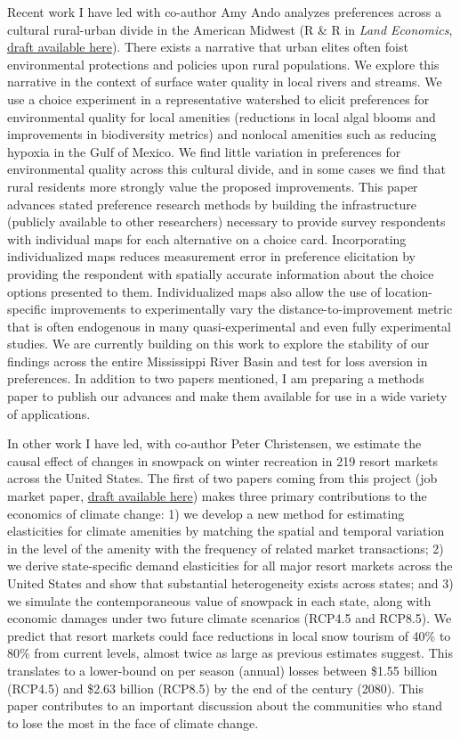\documentclass[12pt]{article}
\begin{document}
Recent work I have led with co-author Amy Ando analyzes preferences across a cultural rural-urban divide in the American Midwest (R \& R in \textit{Land Economics}, \href{https://bryanparthum.s3.us-east-2.amazonaws.com/Parthum_Ando_2019.pdf}{draft available here}). There exists a narrative that urban elites often foist environmental protections and policies upon rural populations. We explore this narrative in the context of surface water quality in local rivers and streams. We use a choice experiment in a representative watershed to elicit preferences for environmental quality for local amenities (reductions in local algal blooms and improvements in biodiversity metrics) and nonlocal amenities such as reducing hypoxia in the Gulf of Mexico. We find little variation in preferences for environmental quality across this cultural divide, and in some cases we find that rural residents more strongly value the proposed improvements. This paper advances stated preference research methods by building the infrastructure (publicly available to other researchers) necessary to provide survey respondents with individual maps for each alternative on a choice card. Incorporating individualized maps reduces measurement error in preference elicitation by providing the respondent with spatially accurate information about the choice options presented to them. Individualized maps also allow the use of location-specific improvements to experimentally vary the distance-to-improvement metric that is often endogenous in many quasi-experimental and even fully experimental studies. We are currently building on this work to explore the stability of our findings across the entire Mississippi River Basin and test for loss aversion in preferences. In addition to two papers mentioned, I am preparing a methods paper to publish our advances and make them available for use in a wide variety of applications.

In other work I have led, with co-author Peter Christensen, we estimate the causal effect of changes in snowpack on winter recreation in 219 resort markets across the United States. The first of two papers coming from this project (job market paper, \href{https://bryanparthum.s3.us-east-2.amazonaws.com/Parthum_Christensen_2019a.pdf}{draft available here}) makes three primary contributions to the economics of climate change: 1) we develop a new method for estimating elasticities for climate amenities by matching the spatial and temporal variation in the level of the amenity with the frequency of related market transactions; 2) we derive state-specific demand elasticities for all major resort markets across the United States and show that substantial heterogeneity exists across states; and 3) we simulate the contemporaneous value of snowpack in each state, along with economic damages under two future climate scenarios (RCP4.5 and RCP8.5). We predict that resort markets could face reductions in local snow tourism of 40\% to 80\% from current levels, almost twice as large as previous estimates suggest. This translates to a lower-bound on per season (annual) losses between \$1.55 billion (RCP4.5) and \$2.63 billion (RCP8.5) by the end of the century (2080). This paper contributes to an important discussion about the communities who stand to lose the most in the face of climate change.
\end{document}
